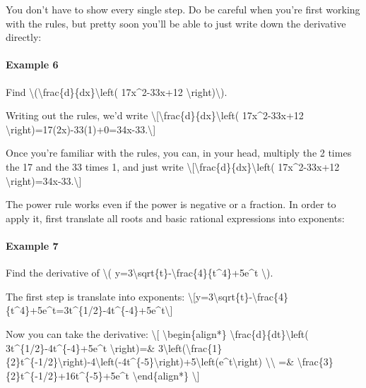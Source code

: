 You don't have to show every single step. Do be careful when you're
first working with the rules, but pretty soon you'll be able to just
write down the derivative directly:

\hypertarget{example-6}{%
\paragraph{Example 6}\label{example-6}}

Find
\textbackslash{}(\textbackslash{}frac\{d\}\{dx\}\textbackslash{}left(
17x\^{}2-33x+12 \textbackslash{}right)\textbackslash{}).

Writing out the rules, we'd write
\textbackslash{}{[}\textbackslash{}frac\{d\}\{dx\}\textbackslash{}left(
17x\^{}2-33x+12
\textbackslash{}right)=17(2x)-33(1)+0=34x-33.\textbackslash{}{]}

Once you're familiar with the rules, you can, in your head, multiply the
2 times the 17 and the 33 times 1, and just write
\textbackslash{}{[}\textbackslash{}frac\{d\}\{dx\}\textbackslash{}left(
17x\^{}2-33x+12 \textbackslash{}right)=34x-33.\textbackslash{}{]}

The power rule works even if the power is negative or a fraction. In
order to apply it, first translate all roots and basic rational
expressions into exponents:

\hypertarget{example-7}{%
\paragraph{Example 7}\label{example-7}}

Find the derivative of \textbackslash{}(
y=3\textbackslash{}sqrt\{t\}-\textbackslash{}frac\{4\}\{t\^{}4\}+5e\^{}t
\textbackslash{}).

The first step is translate into exponents:
\textbackslash{}{[}y=3\textbackslash{}sqrt\{t\}-\textbackslash{}frac\{4\}\{t\^{}4\}+5e\^{}t=3t\^{}\{1/2\}-4t\^{}\{-4\}+5e\^{}t\textbackslash{}{]}

Now you can take the derivative: \textbackslash{}{[}
\textbackslash{}begin\{align*\}
\textbackslash{}frac\{d\}\{dt\}\textbackslash{}left(
3t\^{}\{1/2\}-4t\^{}\{-4\}+5e\^{}t \textbackslash{}right)=\&
3\textbackslash{}left(\textbackslash{}frac\{1\}\{2\}t\^{}\{-1/2\}\textbackslash{}right)-4\textbackslash{}left(-4t\^{}\{-5\}\textbackslash{}right)+5\textbackslash{}left(e\^{}t\textbackslash{}right)
\textbackslash{}\textbackslash{} =\&
\textbackslash{}frac\{3\}\{2\}t\^{}\{-1/2\}+16t\^{}\{-5\}+5e\^{}t
\textbackslash{}end\{align*\} \textbackslash{}{]}


